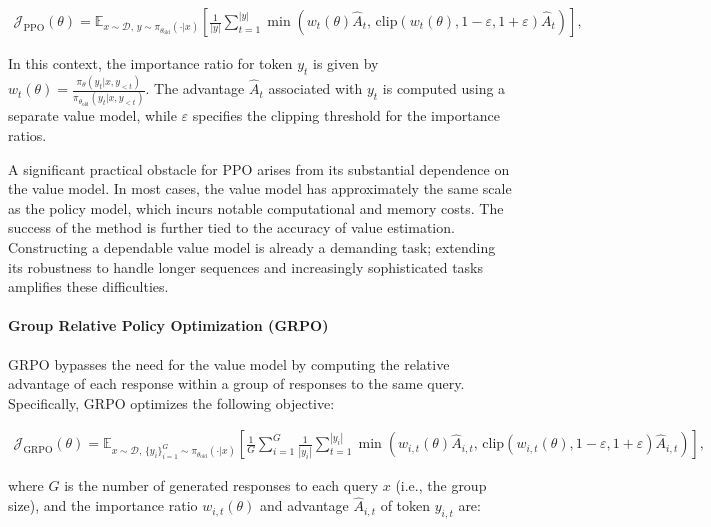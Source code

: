 \begin{align}
\mathcal{J}_\text{PPO}(\theta) = \mathbb{E}_{ x \sim \mathcal{D},\, y \sim \pi_{\theta_\text{old}}( \cdot | x) }
\left[ \frac{1}{|y|} \sum_{t=1}^{|y|} 
\min \left( w_{t}(\theta) \widehat{A}_{t},  \, \mathrm{clip} \left( w_{t}(\theta), 1 - {\varepsilon}, 1 + {\varepsilon}\right) \widehat{A}_{t} \right)
\right],
\end{align}

In this context, the importance ratio for token $y_t$ is given by $w_{t}(\theta) = \frac{ \pi_{\theta} (y_{t} | x, y_{<t}) }{ \pi_{\theta_\text{old}} (y_{t} | x,y_{<t})} $. The advantage $\widehat{A}_{t}$ associated with $y_t$ is computed using a separate value model, while $\varepsilon$ specifies the clipping threshold for the importance ratios.

A significant practical obstacle for PPO arises from its substantial dependence on the value model. In most cases, the value model has approximately the same scale as the policy model, which incurs notable computational and memory costs. The success of the method is further tied to the accuracy of value estimation. Constructing a dependable value model is already a demanding task; extending its robustness to handle longer sequences and increasingly sophisticated tasks amplifies these difficulties.

\paragraph{Group Relative Policy Optimization (GRPO)} GRPO \citep{grpo} bypasses the need for the value model by computing the relative advantage of each response within a group of responses to the same query. Specifically, GRPO optimizes the following objective:

\begin{align}
\label{equ:grpo}
\mathcal{J}_\text{GRPO}(\theta) = \mathbb{E}_{ x \sim \mathcal{D},\, \{y_i\}_{i=1}^G \sim \pi_{\theta_\text{old}}( \cdot | x) }
\left[ \frac{1}{G} \sum_{i=1}^{G} \frac{1}{|y_i|} \sum_{t=1}^{|y_i|} 
\min \left( w_{i,t}(\theta) \widehat{A}_{i,t},  \, \mathrm{clip} \left( w_{i,t}(\theta), 1 - {\varepsilon}, 1 + {\varepsilon}\right) \widehat{A}_{i,t} \right)
\right],
\end{align}

where $G$ is the number of generated responses to each query $x$ (i.e., the group size), and the importance ratio $w_{i,t}(\theta)$ and advantage $\widehat{A}_{i,t}$ of token $y_{i,t}$ are:

